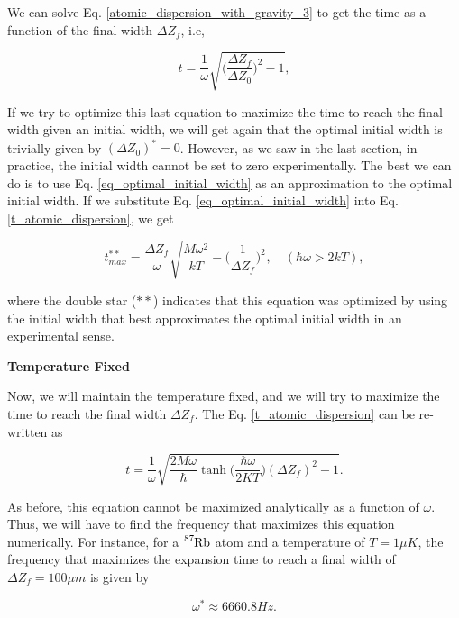 \documentclass{article}
\begin{document}
We can solve Eq. \ref{atomic_dispersion_with_gravity_3} to get the time as a function of the final width $\Delta Z_{f}$, i.e,

\begin{equation}\label{t_atomic_dispersion}
    t = \frac{1}{\omega} \sqrt{\bigg( \frac{\Delta Z_{f}}{\Delta Z_{0}} \bigg)^{2} - 1},
\end{equation}

If we try to optimize this last equation to maximize the time to reach the final width given an initial width, we will get again that the optimal initial width is trivially given by $(\Delta Z_{0})^{*} = 0$. However, as we saw in the last section, in practice, the initial width cannot be set to zero experimentally. The best we can do is to use Eq. \ref{eq_optimal_initial_width} as an approximation to the optimal initial width. If we substitute Eq. \ref{eq_optimal_initial_width} into Eq. \ref{t_atomic_dispersion}, we get

\begin{equation}\label{t_dipole_trap_optimized}
    t^{**}_{max} = \frac{\Delta Z_{f}}{\omega} \sqrt{\frac{M \omega^{2}}{kT} - \bigg(\frac{1}{\Delta Z_{f}}\bigg)^{2}}, \quad (\hbar \omega > 2kT),
\end{equation}

where the double star ($**$) indicates that this equation was optimized by using the initial width that best approximates the optimal initial width in an experimental sense.

\vspace{5mm}
\textbf{Temperature Fixed}

Now, we will maintain the temperature fixed, and we will try to maximize the time to reach the final width $\Delta Z_{f}$. The Eq. \ref{t_atomic_dispersion} can be re-written as

\begin{equation}
    t = \frac{1}{\omega} \sqrt{\frac{2 M \omega}{\hbar} \tanh \bigg( \frac{\hbar \omega}{2 K T} \bigg) (\Delta Z_{f})^{2} -1 }.
\end{equation}

As before, this equation cannot be maximized analytically as a function of $\omega$. Thus, we will have to find the frequency that maximizes this equation numerically. For instance, for a $\ce{^{87}_{}Rb}$ atom and a temperature of $T=1\mu K$, the frequency that maximizes the expansion time to reach a final width of $\Delta Z_{f} = 100 \mu m$ is given by

\begin{equation}
    \omega^{*} \approx 6660.8 Hz.
\end{equation}
\end{document}
